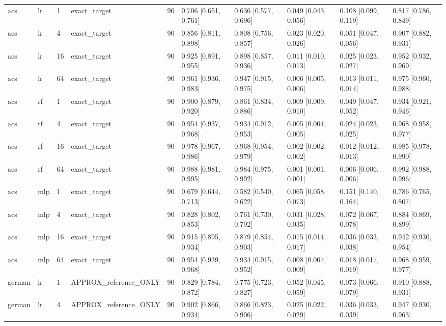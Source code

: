 \begin{tabular}{llllllllll}
acs & lr & 1 & exact\_target & 90 & 0.706 [0.651, 0.761] & 0.636 [0.577, 0.696] & 0.049 [0.043, 0.056] & 0.108 [0.099, 0.119] & 0.817 [0.786, 0.849] \\
acs & lr & 4 & exact\_target & 90 & 0.856 [0.811, 0.898] & 0.808 [0.756, 0.857] & 0.023 [0.020, 0.026] & 0.051 [0.047, 0.056] & 0.907 [0.882, 0.931] \\
acs & lr & 16 & exact\_target & 90 & 0.925 [0.891, 0.955] & 0.898 [0.857, 0.936] & 0.011 [0.010, 0.013] & 0.025 [0.023, 0.027] & 0.952 [0.932, 0.969] \\
acs & lr & 64 & exact\_target & 90 & 0.961 [0.936, 0.983] & 0.947 [0.915, 0.975] & 0.006 [0.005, 0.006] & 0.013 [0.011, 0.014] & 0.975 [0.960, 0.988] \\
acs & rf & 1 & exact\_target & 90 & 0.900 [0.879, 0.920] & 0.861 [0.834, 0.886] & 0.009 [0.009, 0.010] & 0.049 [0.047, 0.052] & 0.934 [0.921, 0.946] \\
acs & rf & 4 & exact\_target & 90 & 0.954 [0.937, 0.968] & 0.934 [0.912, 0.953] & 0.005 [0.004, 0.005] & 0.024 [0.023, 0.025] & 0.968 [0.958, 0.977] \\
acs & rf & 16 & exact\_target & 90 & 0.978 [0.967, 0.986] & 0.968 [0.954, 0.979] & 0.002 [0.002, 0.002] & 0.012 [0.012, 0.013] & 0.985 [0.978, 0.990] \\
acs & rf & 64 & exact\_target & 90 & 0.988 [0.981, 0.995] & 0.984 [0.975, 0.992] & 0.001 [0.001, 0.001] & 0.006 [0.006, 0.006] & 0.992 [0.988, 0.996] \\
acs & mlp & 1 & exact\_target & 90 & 0.679 [0.644, 0.713] & 0.582 [0.540, 0.622] & 0.065 [0.058, 0.073] & 0.151 [0.140, 0.164] & 0.786 [0.765, 0.807] \\
acs & mlp & 4 & exact\_target & 90 & 0.828 [0.802, 0.853] & 0.761 [0.730, 0.792] & 0.031 [0.028, 0.035] & 0.072 [0.067, 0.078] & 0.884 [0.869, 0.899] \\
acs & mlp & 16 & exact\_target & 90 & 0.915 [0.895, 0.934] & 0.879 [0.854, 0.903] & 0.015 [0.014, 0.017] & 0.036 [0.033, 0.038] & 0.942 [0.930, 0.954] \\
acs & mlp & 64 & exact\_target & 90 & 0.954 [0.939, 0.968] & 0.934 [0.915, 0.952] & 0.008 [0.007, 0.009] & 0.018 [0.017, 0.019] & 0.968 [0.959, 0.977] \\
german & lr & 1 & APPROX\_reference\_ONLY & 90 & 0.829 [0.784, 0.872] & 0.775 [0.723, 0.827] & 0.052 [0.045, 0.059] & 0.073 [0.066, 0.079] & 0.910 [0.888, 0.931] \\
german & lr & 4 & APPROX\_reference\_ONLY & 90 & 0.902 [0.866, 0.934] & 0.866 [0.823, 0.906] & 0.025 [0.022, 0.029] & 0.036 [0.033, 0.039] & 0.947 [0.930, 0.963] \\

\end{tabular}
